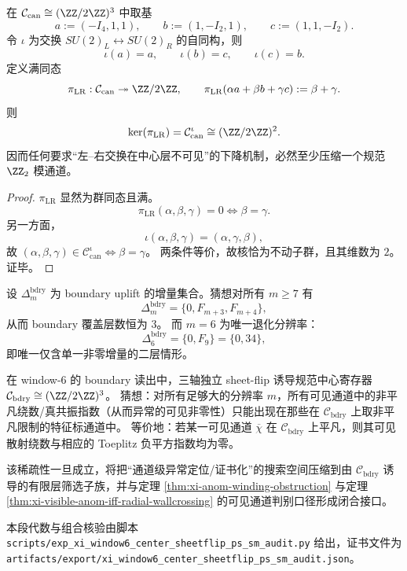 \begin{theorem}[左--右交换下的规范中心模与不可下降通道]\label{thm:xi-window6-lr-swap-canonical-center-mod}
在 \(\mathcal C_{\mathrm{can}}\cong(\ZZ/2\ZZ)^3\) 中取基
\[
a:=(-I_4,1,1),\qquad b:=(1,-I_2,1),\qquad c:=(1,1,-I_2).
\]
令 \(\iota\) 为交换 \(SU(2)_L\leftrightarrow SU(2)_R\) 的自同构，则
\[
\iota(a)=a,\qquad \iota(b)=c,\qquad \iota(c)=b.
\]
定义满同态
\[
\pi_{\mathrm{LR}}:\mathcal C_{\mathrm{can}}\twoheadrightarrow \ZZ/2\ZZ,\qquad
\pi_{\mathrm{LR}}(\alpha a+\beta b+\gamma c):=\beta+\gamma.
\]
则
\[
\ker(\pi_{\mathrm{LR}})=\mathcal C_{\mathrm{can}}^{\iota}
\cong (\ZZ/2\ZZ)^2.
\]
因而任何要求“左--右交换在中心层不可见”的下降机制，必然至少压缩一个规范 \(\ZZ_2\) 模通道。
\end{theorem}
\begin{proof}
\(\pi_{\mathrm{LR}}\) 显然为群同态且满。
\[
\pi_{\mathrm{LR}}(\alpha,\beta,\gamma)=0
\iff \beta=\gamma.
\]
另一方面，
\[
\iota(\alpha,\beta,\gamma)=(\alpha,\gamma,\beta),
\]
故
\(
(\alpha,\beta,\gamma)\in\mathcal C_{\mathrm{can}}^{\iota}
\iff \beta=\gamma
\)。
两条件等价，故核恰为不动子群，且其维数为 \(2\)。证毕。
\end{proof}

\begin{conjecture}[dyadic boundary uplift 层数在 \(m=6\) 的唯一退化]\label{conj:xi-window6-bdry-uplift-unique-degeneration}
设 \(\Delta_m^{\mathrm{bdry}}\) 为 boundary uplift 的增量集合。猜想对所有 \(m\ge 7\) 有
\[
\Delta_m^{\mathrm{bdry}}=\{0,F_{m+3},F_{m+4}\},
\]
从而 boundary 覆盖层数恒为 \(3\)。
而 \(m=6\) 为唯一退化分辨率：
\[
\Delta_6^{\mathrm{bdry}}=\{0,F_9\}=\{0,34\},
\]
即唯一仅含单一非零增量的二层情形。
\end{conjecture}

\begin{conjecture}\label{conj:xi-anomaly-resonance-channel-sparsity-controlled-by-boundary-parity}
在 window-\(6\) 的 boundary 读出中，三轴独立 sheet-flip 诱导规范中心寄存器
\(\mathcal C_{\mathrm{bdry}}\cong(\ZZ/2\ZZ)^3\)。
猜想：对所有足够大的分辨率 \(m\)，所有可见通道中的非平凡绕数/真共振指数（从而异常的可见非零性）只能出现在那些在 \(\mathcal C_{\mathrm{bdry}}\) 上取非平凡限制的特征标通道中。
等价地：若某一可见通道 \(\overline\chi\) 在 \(\mathcal C_{\mathrm{bdry}}\) 上平凡，则其可见散射绕数与相应的 Toeplitz 负平方指数均为零。
\par
该稀疏性一旦成立，将把“通道级异常定位/证书化”的搜索空间压缩到由 \(\mathcal C_{\mathrm{bdry}}\) 诱导的有限层筛选子族，并与定理 \ref{thm:xi-anom-winding-obstruction} 与定理 \ref{thm:xi-visible-anom-iff-radial-wallcrossing} 的可见通道判别口径形成闭合接口。
\end{conjecture}

\begin{remark}[可复现核验脚本]\label{rem:xi-window6-center-sheetflip-ps-sm-audit-script}
本段代数与组合核验由脚本
\texttt{scripts/exp\_xi\_window6\_center\_sheetflip\_ps\_sm\_audit.py}
给出，证书文件为
\texttt{artifacts/export/xi\_window6\_center\_sheetflip\_ps\_sm\_audit.json}。
\end{remark}
